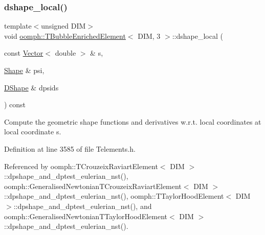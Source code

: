 \subsubsection{\texorpdfstring{dshape\+\_\+local()}{dshape\_local()}}
{\footnotesize\ttfamily template$<$unsigned D\+IM$>$ \\
void \hyperlink{classoomph_1_1TBubbleEnrichedElement}{oomph\+::\+T\+Bubble\+Enriched\+Element}$<$ D\+IM, 3 $>$\+::dshape\+\_\+local (\begin{DoxyParamCaption}\item[{const \hyperlink{classoomph_1_1Vector}{Vector}$<$ double $>$ \&}]{s,  }\item[{\hyperlink{classoomph_1_1Shape}{Shape} \&}]{psi,  }\item[{\hyperlink{classoomph_1_1DShape}{D\+Shape} \&}]{dpsids }\end{DoxyParamCaption}) const\hspace{0.3cm}{\ttfamily [inline]}}



Compute the geometric shape functions and derivatives w.\+r.\+t. local coordinates at local coordinate s. 



Definition at line 3585 of file Telements.\+h.



Referenced by oomph\+::\+T\+Crouzeix\+Raviart\+Element$<$ D\+I\+M $>$\+::dpshape\+\_\+and\+\_\+dptest\+\_\+eulerian\+\_\+nst(), oomph\+::\+Generalised\+Newtonian\+T\+Crouzeix\+Raviart\+Element$<$ D\+I\+M $>$\+::dpshape\+\_\+and\+\_\+dptest\+\_\+eulerian\+\_\+nst(), oomph\+::\+T\+Taylor\+Hood\+Element$<$ D\+I\+M $>$\+::dpshape\+\_\+and\+\_\+dptest\+\_\+eulerian\+\_\+nst(), and oomph\+::\+Generalised\+Newtonian\+T\+Taylor\+Hood\+Element$<$ D\+I\+M $>$\+::dpshape\+\_\+and\+\_\+dptest\+\_\+eulerian\+\_\+nst().

\mbox{\label{classoomph_1_1TBubbleEnrichedElement_3_01DIM_00_013_01_4_af0da229b9fbea583877e7fa5d5992cdb}} 
